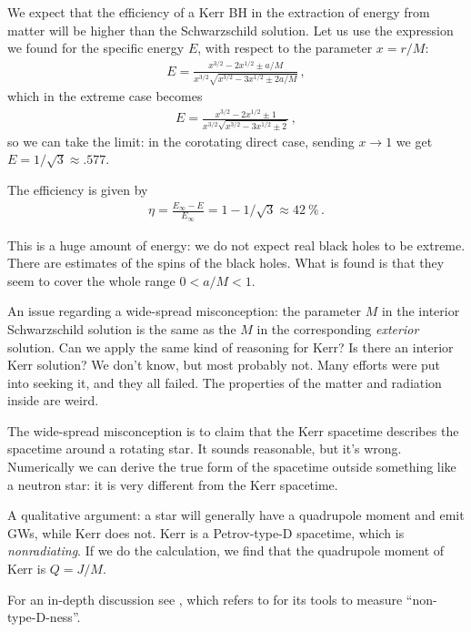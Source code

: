 \documentclass[main.tex]{subfiles}
\begin{document}
We expect that the efficiency of a Kerr BH in the extraction of energy from matter will be higher than the Schwarzschild solution. 
Let us use the expression we found for the specific energy \(E\), with respect to the parameter \(x = r/M\): 
%
\begin{align}
E = \frac{x^{3/2} - 2 x^{1/2} \pm a/M}{x^{3/2} \sqrt{x^{3/2} - 3x^{1/2} \pm 2a /M}}
\,,
\end{align}
%
which in the extreme case becomes 
%
\begin{align}
E = \frac{x^{3/2} - 2 x^{1/2} \pm 1}{x^{3/2} \sqrt{x^{3/2 }- 3 x^{1/2} \pm 2}}
\,,
\end{align}
%
so we can take the limit: in the corotating direct case, sending \(x \to 1\) we get \(E = 1 / \sqrt{3} \approx \num{.577}\). 

The efficiency is given by 
%
\begin{align}
\eta = \frac{E_\infty  - E}{E_{\infty }} = 1 - 1 / \sqrt{3} \approx \SI{42}{\percent}
\,.
\end{align}

This is a huge amount of energy: we do not expect real black holes to be extreme. 
There are estimates of the spins of the black holes. 
What is found is that they seem to cover the whole range \(0 < a/ M < 1\). 

An issue regarding a wide-spread misconception: the parameter \(M\) in the interior Schwarzschild solution is the same as the \(M\) in the corresponding \emph{exterior} solution. Can we apply the same kind of reasoning for Kerr?
Is there an interior Kerr solution? 
We don't know, but most probably not. 
Many efforts were put into seeking it, and they all failed. 
The properties of the matter and radiation inside are weird. 

The wide-spread misconception is to claim that the Kerr spacetime describes the spacetime around a rotating star. 
It sounds reasonable, but it's wrong. 
Numerically we can derive the true form of the spacetime outside something like a neutron star: it is very different from the Kerr spacetime. 

A qualitative argument: a star will generally have a quadrupole moment and emit GWs, while Kerr does not. 
Kerr is a Petrov-type-D spacetime, which is \emph{nonradiating}. 
If we do the calculation, we find that the quadrupole moment of Kerr is \(Q = J / M\). 

For an in-depth discussion see \textcite[]{bertiRotatingNeutronStars2005}, which refers to \textcite[]{bakerMakingUseGeometrical2000} for its tools to measure ``non-type-D-ness''.
\end{document}

